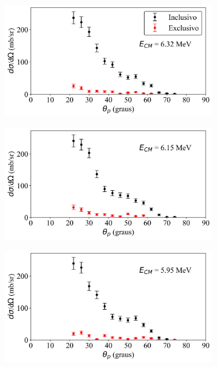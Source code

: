 \documentclass[a4paper,12pt,oneside]{book}
\begin{document}
\begin{figure}[H]
\centering
    \begin{subfigure}[b]{0.49\textwidth}
        \centering
        \includegraphics[scale=0.38, width=1.\columnwidth]{figs/dist_angs/dist_ang_0.png}
        \caption{}
        \label{subfig:dist_ang_a}
    \end{subfigure}%
    \hfill
    \begin{subfigure}[b]{0.48\textwidth}
        \centering
        \includegraphics[scale=0.38, width=1.\columnwidth]{figs/dist_angs/dist_ang_1.png}
        \caption{}
        \label{subfig:dist_ang_b}
    \end{subfigure}
    \begin{subfigure}[b]{0.49\textwidth}
        \centering
        \includegraphics[scale=0.38, width=1.\columnwidth]{figs/dist_angs/dist_ang_2.png}

\end{subfigure}
\end{figure}
\end{document}

